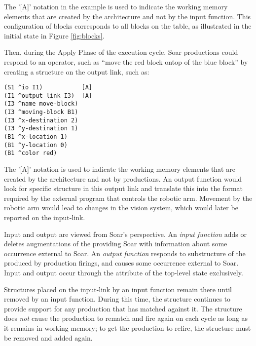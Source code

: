 The '[A]' notation in the example is used to indicate the working memory
elements that are created by the architecture and not by the input function.
This configuration of blocks corresponds to all blocks on the table, as
illustrated in the initial state in Figure \ref{fig:blocks}.

\begin{figure}
\label{fig:blocks-outputlink}
\end{figure}

Then, during the Apply Phase of the execution cycle, Soar productions could 
respond to an operator, such as ``move the red block
ontop of the blue block'' by creating a structure on the output link, such as:

\begin{verbatim}
(S1 ^io I1)           [A]
(I1 ^output-link I3)  [A]
(I3 ^name move-block)
(I3 ^moving-block B1)
(I3 ^x-destination 2)
(I3 ^y-destination 1)
(B1 ^x-location 1)
(B1 ^y-location 0)
(B1 ^color red)
\end{verbatim}  \vspace{12pt}

The '[A]' notation is used to indicate the working memory elements 
that are created by the architecture and not by productions.
An output function would look for specific structure in this output link and
translate this into the format required by the external program that controls
the robotic arm. Movement by the robotic arm would lead to changes in the 
vision system, which would later be reported on the input-link.

Input and output are viewed from Soar's perspective. An \emph{input
function} adds or deletes augmentations of the  
providing Soar with information about some occurrence external to Soar. An
\emph{output function} responds to substructure of the 
produced by production firings, and causes some occurrence external to
Soar. Input and output occur through the  attribute of the top-level
state exclusively.

Structures placed on the input-link by an input function remain there until removed
by an input function. During this time, the structure continues to provide support for
any production that has matched against it. The structure does \emph{not} cause the production
to rematch and fire again on each cycle as long as it remains in working memory;
to get the production to refire, the structure must be removed and added again.




